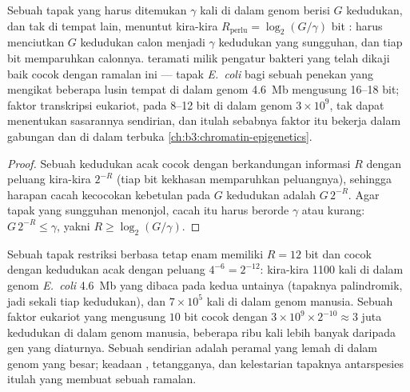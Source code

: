 \begin{proposition}\label{prop:b3:bioinformatics:bits}
Sebuah tapak yang harus ditemukan $\gamma$ kali di dalam genom berisi $G$
kedudukan, dan tak di tempat lain, menuntut kira-kira
$R_{\text{perlu}} = \log_{2}(G/\gamma)$
bit :  harus menciutkan $G$ kedudukan calon
menjadi $\gamma$ kedudukan yang sungguhan, dan tiap bit memparuhkan
calonnya.  teramati milik pengatur bakteri yang telah dikaji baik cocok
dengan ramalan ini --- tapak \emph{E.~coli} bagi sebuah penekan yang mengikat
beberapa lusin tempat di dalam genom \qty{4.6}{Mb} mengusung
\numrange{16}{18} bit;  faktor transkripsi eukariot, pada
\numrange{8}{12} bit di dalam genom $3\times 10^{9}$, tak dapat menentukan
sasarannya sendirian, dan itulah sebabnya faktor itu bekerja dalam gabungan
dan di dalam  terbuka \cref{ch:b3:chromatin-epigenetics}.
\end{proposition}
\begin{proof}
Sebuah kedudukan acak cocok dengan  berkandungan informasi $R$ dengan
peluang kira-kira $2^{-R}$ (tiap bit kekhasan memparuhkan peluangnya),
sehingga harapan cacah kecocokan kebetulan pada $G$ kedudukan adalah $G\,2^{-R}$.
Agar tapak yang sungguhan menonjol, cacah itu harus berorde $\gamma$ atau
kurang: $G\,2^{-R} \le \gamma$, yakni $R \ge \log_{2}(G/\gamma)$.
\end{proof}

\begin{example}\label{ex:b3:bioinformatics:motif-numbers}
Sebuah tapak restriksi berbasa tetap enam memiliki $R = 12$ bit dan cocok
dengan kedudukan acak dengan peluang $4^{-6} = 2^{-12}$: kira-kira \num{1100}
kali di dalam genom \emph{E.~coli} \qty{4.6}{Mb} yang dibaca pada kedua
untainya (tapaknya palindromik, jadi sekali tiap kedudukan), dan $7\times 10^{5}$
kali di dalam genom manusia. Sebuah faktor eukariot yang  mengusung
$10$ bit cocok dengan $3\times 10^{9}\times 2^{-10} \approx 3$ juta
kedudukan di dalam genom manusia, beberapa ribu kali lebih banyak daripada
gen yang diaturnya. Sebuah  sendirian adalah peramal yang lemah di dalam
genom yang besar; keadaan ,  tetangganya, dan
kelestarian tapaknya antarspesies itulah yang membuat sebuah ramalan.
\end{example}

